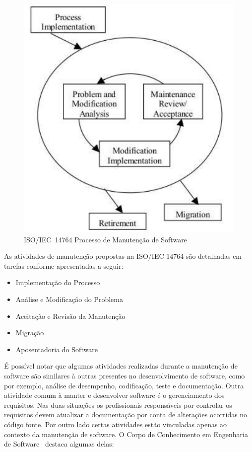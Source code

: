 \begin{figure}[htpb] \centering
	\includegraphics[width=0.7\linewidth]
{chapter-manutencao-software-visao-geral/img/ieee-14764-processo-manutencao.pdf}
	\caption{ISO/IEC~14764 Processo de Manutenção de Software}
\label{fig:ieee-14764-processo-manutencao} \end{figure}

As atividades de manutenção propostas na ISO/IEC 14764 são detalhadas em tarefas
conforme apresentadas a seguir:

\begin{itemize}
   	\item Implementação do Processo
   	\item Análise e Modificação do
		Problema
	\item Aceitação e Revisão da Manutenção
   	\item Migração
   	\item Aposentadoria do Software
\end{itemize}

É possível notar que algumas atividades realizadas durante a manutenção de
software são similares à outras presentes no desenvolvimento de software, como
por exemplo, análise de desempenho, codificação, teste e documentação. Outra
atividade comum à manter e desenvolver software é o gerenciamento dos
requisitos. Nas duas situações os profissionais responsáveis por controlar os
requisitos devem atualizar a do\-cu\-men\-ta\-ção  por conta de alterações
ocorridas no código fonte. Por outro lado certas atividades estão vinculadas
apenas ao contexto da manutenção de software. O Corpo de Conhecimento em
Engenharia de Software~\cite{4425813} destaca algumas delas:

